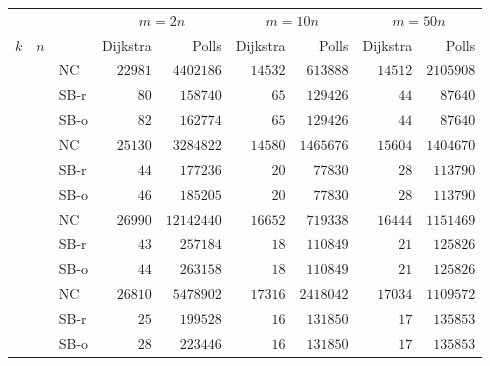 \documentclass[runningheads,a4paper]{llncs}
\begin{document}
\begin{table}[tb]
\scriptsize
\centering
\begin{tabularx}{1\textwidth}{p{0.8cm}p{0.8cm}p{0.8cm}|RR|RR|RR}
 & & &  &  &  \\
 \centering $k$ & \centering $n$ & & Dijkstra & Polls & Dijkstra & Polls & Dijkstra & Polls \\
\hline
\centering{} & \centering{} & \centering NC & $\num{22981}$ & $\num{4402186}$ & $\num{14532}$ & $\num{613888}$ & $\num{14512}$ & $\num{2105908}$ \\
 & & \centering SB-r  & $\num{80}$ & $\num{158740}$ & $\num{65}$ & $\num{129426}$ & $\num{44}$ & $\num{87640}$ \\
 & & \centering SB-o  & $\num{82}$ & $\num{162774}$ & $\num{65}$ & $\num{129426}$ & $\num{44}$ & $\num{87640}$ \\
 & \centering{} & \centering NC & $\num{25130}$ & $\num{3284822}$ & $\num{14580}$ & $\num{1465676}$ & $\num{15604}$ & $\num{1404670}$ \\
 & & \centering SB-r  & $\num{44}$ & $\num{177236}$ & $\num{20}$ & $\num{77830}$ & $\num{28}$ & $\num{113790}$ \\
 & & \centering SB-o  & $\num{46}$ & $\num{185205}$ & $\num{20}$ & $\num{77830}$ & $\num{28}$ & $\num{113790}$ \\
 & \centering{} & \centering NC & $\num{26990}$ & $\num{12142440}$ & $\num{16652}$ & $\num{719338}$ & $\num{16444}$ & $\num{1151469}$ \\
 & & \centering SB-r  & $\num{43}$ & $\num{257184}$ & $\num{18}$ & $\num{110849}$ & $\num{21}$ & $\num{125826}$ \\
 & & \centering SB-o  & $\num{44}$ & $\num{263158}$ & $\num{18}$ & $\num{110849}$ & $\num{21}$ & $\num{125826}$ \\
 & \centering{} & \centering NC & $\num{26810}$ & $\num{5478902}$ & $\num{17316}$ & $\num{2418042}$ & $\num{17034}$ & $\num{1109572}$ \\
 & & \centering SB-r  & $\num{25}$ & $\num{199528}$ & $\num{16}$ & $\num{131850}$ & $\num{17}$ & $\num{135853}$ \\
 & & \centering SB-o  & $\num{28}$ & $\num{223446}$ & $\num{16}$ & $\num{131850}$ & $\num{17}$ & $\num{135853}$ \\

\end{tabularx}
\end{table}
\end{document}
